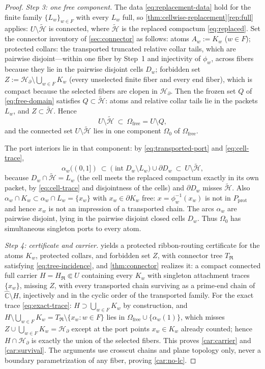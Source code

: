 \documentclass[11pt,reqno]{amsart}
\numberwithin{equation}{section}
\theoremstyle{plain}
\theoremstyle{definition}
\theoremstyle{remark}
\newcommand{\Chat}{\widehat{\mathbb C}}
\newcommand{\HB}{\mathcal H_\partial}
\begin{document}
\begin{proof}
\emph{Step 3: one free component.}
The data \eqref{eq:replacement-data} hold for the finite family
$\{L_w\}_{w\in F}$ with every $L_w$ full, so
\cref{thm:cellwise-replacement}\ref{rep:full} applies:
$U\setminus\widetilde{\mathcal H}$ is connected, where
$\widetilde{\mathcal H}$ is the replaced compactum
\eqref{eq:replaced}.  Set the connector inventory of
\cref{sec:connector} as follows: atoms $A_w:=K_w$ ($w\in F$); protected
collars: the transported truncated relative collar tails, which are
pairwise disjoint---within one fiber by Step~1 and injectivity of
$\phi_w$, across fibers because they lie in the pairwise disjoint
cells $D_w$; forbidden set
$Z:=\HB\setminus\bigcup_{w\in F}K_w$ (every unselected finite fiber
and every end fiber), which is compact because the selected fibers are
clopen in $\HB$.  Then the frozen set $Q$ of \eqref{eq:free-domain}
satisfies $Q\subset\widetilde{\mathcal H}$: atoms and relative collar
tails lie in the packets $L_w$, and
$Z\subset\widetilde{\mathcal H}$.  Hence
\[
 U\setminus\widetilde{\mathcal H}\ \subset\
 \Omega_{\mathrm{free}}=U\setminus Q,
\]
and the connected set $U\setminus\widetilde{\mathcal H}$ lies in one
component $\Omega_0$ of $\Omega_{\mathrm{free}}$.

The port interiors lie in that component: by
\eqref{eq:transported-port} and \eqref{eq:cell-trace},
\[
 \alpha_w((0,1])\ \subset\
 \bigl(\operatorname{int}D_w\setminus L_w\bigr)
 \cup\partial D_w
 \ \subset\ U\setminus\widetilde{\mathcal H},
\]
because $D_w\cap\widetilde{\mathcal H}=L_w$ (the cell meets the
replaced compactum exactly in its own packet, by \eqref{eq:cell-trace}
and disjointness of the cells) and $\partial D_w$ misses
$\widetilde{\mathcal H}$.  Also
$\alpha_w\cap K_w\subset\alpha_w\cap L_w=\{x_w\}$ with
$x_w\in\partial K_w$ free: $x=\phi_w^{-1}(x_w)$ is not in
$P_{\mathrm{prot}}$ and hence $x_w$ is not an impression of a
transported chain.  The arcs $\alpha_w$ are pairwise disjoint, lying
in the pairwise disjoint closed cells $D_w$.  Thus $\Omega_0$ has
simultaneous singleton ports to every atom.

\emph{Step 4: certificate and carrier.}
 yields a protected ribbon-routing
certificate for the atoms $K_w$, protected collars, and forbidden set
$Z$, with connector tree $T_{\mathfrak R}$ satisfying
\eqref{eq:tree-incidence}, and \cref{thm:connector} realizes it: a
compact connected full carrier $H=H_{\mathfrak R}\Subset U$ containing
every $K_w$ with singleton attachment traces $\{x_w\}$, missing $Z$,
with every transported chain surviving as a prime-end chain of
$\Chat\setminus H$, injectively and in the cyclic order of the
transported family.  For the exact trace \eqref{eq:exact-trace}:
$H\supset\bigcup_{w\in F}K_w$ by construction, and
$H\setminus\bigcup_{w\in F}K_w=T_{\mathfrak R}\setminus\{x_w:w\in F\}$
lies in $\Omega_{\mathrm{free}}\cup\{\alpha_w(1)\}$, which misses
$Z\cup\bigcup_{w\in F}K_w=\HB$ except at the port points
$x_w\in K_w$ already counted; hence $H\cap\HB$ is exactly the union of
the selected fibers.  This proves \ref{car:carrier} and
\ref{car:survival}.  The arguments use crosscut chains and plane
topology only, never a boundary parametrization of any fiber, proving
\ref{car:no-lc}.
\end{proof}
\end{document}
